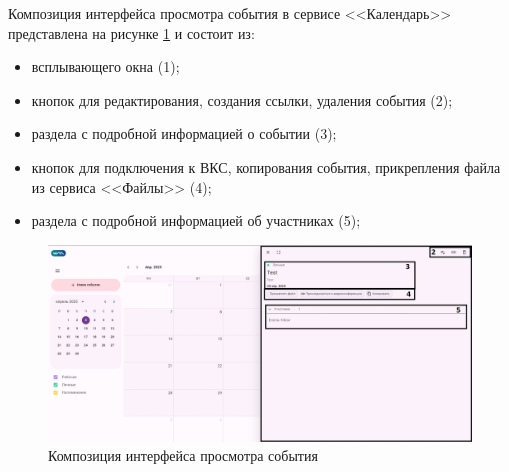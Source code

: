 Композиция интерфейса просмотра события в сервисе <<Календарь>> представлена на рисунке \ref{templ:image3c} и состоит из:
\begin{itemize}
  \item всплывающего окна (1);
  \item кнопок для редактирования, создания ссылки, удаления события (2);
  \item раздела с подробной информацией о событии (3);
  \item кнопок для подключения к ВКС, копирования события, прикрепления файла из сервиса <<Файлы>> (4);
  \item раздела с подробной информацией об участниках (5);
\end{itemize}
\begin{figure}[H]
	\centering
	\includegraphics[width=1\linewidth]{images/календарь3}
	\caption{Композиция интерфейса просмотра события}
	\label{templ:image3c}
\end{figure}

